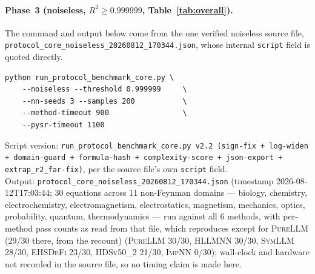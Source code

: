 \documentclass[twoside,11pt]{article}
\newcommand{\PureLLM}{\textsc{PureLLM}}
\newcommand{\INN}{\textsc{ImpNN}}
\newcommand{\EHD}{\textsc{EHSDeFi}}
\newcommand{\HSL}{\textsc{HLLMNN}}
\newcommand{\SEL}{\textsc{SymLLM}}
\newcommand{\HDS}{\textsc{HDSv50\_2}}
\begin{document}
\paragraph{Phase~3 (noiseless, $R^2\geq0.999999$, Table~\ref{tab:overall}).}
The command and output below come from the one verified noiseless source file, \texttt{protocol\_core\_noiseless\_20260812\_170344.json}, whose internal \texttt{script} field is quoted directly.
\begin{verbatim}
python run_protocol_benchmark_core.py \
    --noiseless --threshold 0.999999     \
    --nn-seeds 3 --samples 200           \
    --method-timeout 900                 \
    --pysr-timeout 1100
\end{verbatim}
Script version: \texttt{run\_protocol\_benchmark\_core.py v2.2 (sign-fix +
log-widen + domain-guard + formula-hash + complexity-score + json-export +
extrap\_r2\_far-fix)}, per the source file's own \texttt{script} field.\\
Output: \texttt{protocol\_core\_noiseless\_20260812\_170344.json}
(timestamp 2026-08-12T17:03:44; 30 equations across 11 non-Feynman domains
--- biology, chemistry, electrochemistry, electromagnetism, electrostatics,
magnetism, mechanics, optics, probability, quantum, thermodynamics --- run
against all 6 methods, with per-method pass counts as read from that file, which
\Cref{tab:overall} reproduces except for \PureLLM{} (29/30 there, from the recount) (\PureLLM{} 30/30, \HSL{} 30/30, \SEL{} 28/30, \EHD{}
23/30, \HDS{} 21/30, \INN{} 0/30); wall-clock and hardware not recorded in
the source file, so no timing claim is made here.
\end{document}
